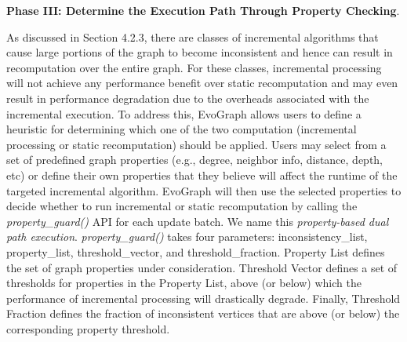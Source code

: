 \textbf{Phase III: Determine the Execution Path Through Property Checking}. %



As discussed in Section 4.2.3, there are classes of incremental algorithms that cause large portions of the graph to become inconsistent and hence can result in recomputation over the entire graph. For these classes, incremental processing will not achieve any performance benefit over static recomputation and may even result in performance degradation due to the overheads associated with the incremental execution. To address this, EvoGraph allows users to define a heuristic for determining which one of the two computation (incremental processing or static recomputation) should be applied. Users may select from a set of predefined graph properties (e.g., degree, neighbor info, distance, depth, etc) or define their own properties that they believe will affect the runtime of the targeted incremental algorithm. EvoGraph will then use the selected properties to decide whether to run incremental or static recomputation by calling the \textit{property\_guard()} API for each update batch. We name this \textit{property-based dual path execution}. \textit{property\_guard()} takes four parameters: inconsistency\_list, property\_list, threshold\_vector, and threshold\_fraction. Property List defines the set of graph properties under consideration. Threshold Vector defines a set of thresholds for properties in the Property List, above (or below) which the performance of incremental processing will drastically degrade. Finally, Threshold Fraction defines the fraction of inconsistent vertices that are above (or below) the corresponding property threshold. 


